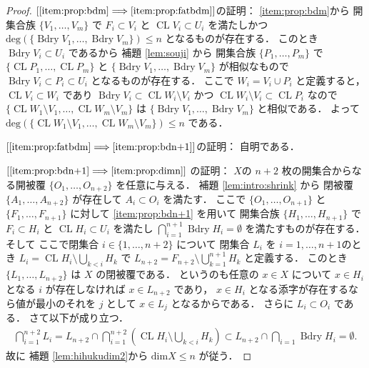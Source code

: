 \documentclass[leqno, a4paper, 12pt]{jsarticle}
\theoremstyle{plain}
\theoremstyle{definition}
\theoremstyle{remark}
\newcommand{\To}{\Longrightarrow}
\DeclareMathOperator{\bd}{\mathrm{Bdry}}
\DeclareMathOperator{\cl}{\mathrm{CL}}
\newcommand{\yodim}{\mathrm{dim}}
\newcommand{\yodeg}{\mathrm{deg}}
\numberwithin{equation}{section}
\begin{document}
\begin{proof}
$[\ref{item:prop:bdm}\To \ref{item:prop:fatbdm}]$の証明：
\ref{item:prop:bdm}から
開集合族
$\{V_{1}, \dots, V_{m}\}$
で
$F_{i}\subset V_{i}$
と
$\cl V_{i}\subset U_{i}$
を満たしかつ
$\yodeg(\{\bd V_{1}, \dots, \bd V_{m}\})\le n$
となるものが存在する．
このとき
$\bd V_{i}\subset U_{i}$
であるから
補題
\ref{lem:souji}
から
開集合族
$\{P_{1}, \dots, P_{m}\}$
で
$\{\cl P_{1}, \dots, \cl P_{m}\}$
と
$\{\bd V_{1}, \dots, \bd V_{m}\}$
が相似なもので
$\bd V_{i}\subset P_{i}\subset U_{i}$
となるものが存在する．
ここで
$W_{i}=V_{i}\cup P_{i}$
と定義すると，
$\cl V_{i}\subset W_{i}$
であり
$\bd V_{i} \subset \cl W_{i}\setminus V_{i}$
かつ
$\cl W_{i}\setminus V_{i}\subset \cl P_{i}$
なので
$\{\cl W_{1}\setminus V_{1}, \dots, \cl W_{m}\setminus V_{m}\}$
は
$\{\bd V_{1}, \dots, \bd V_{m}\}$
と相似である．
よって
$\yodeg (\{\cl W_{1}\setminus V_{1}, \dots, \cl W_{m}\setminus V_{m}\})\le n$
である．


$[\ref{item:prop:fatbdm}\To \ref{item:prop:bdn+1}]$の証明：
自明である．

$[\ref{item:prop:bdn+1} \To \ref{item:prop:dimn}]$
の証明：
$X$の
$n+2$
枚の開集合からなる開被覆
$\{O_{1}, \dots, O_{n+2}\}$
を任意に与える．
補題
\ref{lem:intro:shrink}
から
閉被覆
$\{A_{1}, \dots, A_{n+2}\}$
が存在して
$A_{i}\subset O_{i}$
を満たす．
ここで
$\{O_{1}, \dots,  O_{n+1}\}$
と
$\{F_{1}, \dots,  F_{n+1}\}$
に対して
\ref{item:prop:bdn+1}
を用いて
開集合族
$\{H_{1}, \dots, H_{n+1}\}$
で
$F_{i}\subset H_{i}$
と
$\cl H_{i}\subset U_{i}$
を満たし
$\bigcap_{i=1}^{n+1}\bd H_{i}=\emptyset$
を満たすものが存在する．
そして
ここで閉集合
$i\in \{1, \dots, n+2\}$
について
閉集合
$L_{i}$
を
$i=1, \dots, n+1$のとき
$L_{i}=\cl H_{i}\setminus \bigcup_{k<i} H_{k}$
で
$L_{n+2}=F_{n+2}\setminus \bigcup_{k=1}^{n+1}H_{k}$
と定義する．
このとき
$\{L_{1}, \dots, L_{n+2}\}$
は
$X$
の閉被覆である．
というのも任意の
$x\in X$
について
$x\in H_{i}$
となる
$i$
が存在しなければ
$x\in L_{n+2}$
であり，
$x\in H_{i}$
となる添字が存在するなら値が最小のそれを
$j$
として
$x\in L_{j}$
となるからである．
さらに
$L_{i}\subset O_{i}$
である．
さて以下が成り立つ．
\begin{align}
\bigcap_{i=1}^{n+2}L_{i}
=L_{n+2}\cap \bigcap_{i=1}^{n+2}\left(\cl H_{i}\setminus \bigcup_{k<i} H_{k}\right)
\subset L_{n+2}\cap \bigcap_{i=1}\bd H_{i}=\emptyset. 
\end{align}
故に
補題
\ref{lem:hihukudim2}から
$\yodim X\le n$
が従う．
\end{proof}
\end{document}
